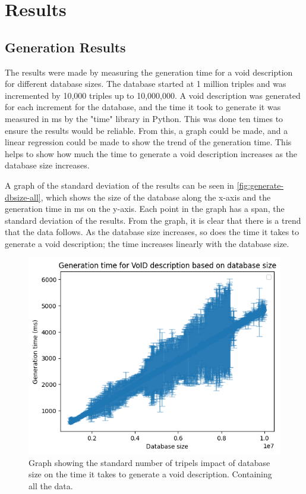 \section{Results}\label{sec:results}
\subsection{Generation Results}\label{subsec:generation-results}
The results were made by measuring the generation time for a \gls{void} description for different database sizes. The database started at 1 million triples and was incremented by 10,000 triples up to 10,000,000. A \gls{void} description was generated for each increment for the database, and the time it took to generate it was measured in ms by the "time" library in Python. This was done ten times to ensure the results would be reliable. From this, a graph could be made, and a linear regression could be made to show the trend of the generation time. This helps to show how much the time to generate a \gls{void} description increases as the database size increases.

A graph of the standard deviation of the results can be seen in \autoref{fig:generate-dbsize-all}, which shows the size of the database along the x-axis and the generation time in ms on the y-axis. Each point in the graph has a span, the standard deviation of the results. From the graph, it is clear that there is a trend that the data follows. As the database size increases, so does the time it takes to generate a \gls{void} description; the time increases linearly with the database size.

\begin{figure}[htb!]
    \centering
    \includegraphics[width=0.8\columnwidth]{figures/generation-results-graph.png}
    \caption{Graph showing the standard number of tripels impact of database size on the time it takes to generate a \gls{void} description. Containing all the data.}
    \label{fig:generate-dbsize-all}
\end{figure}


